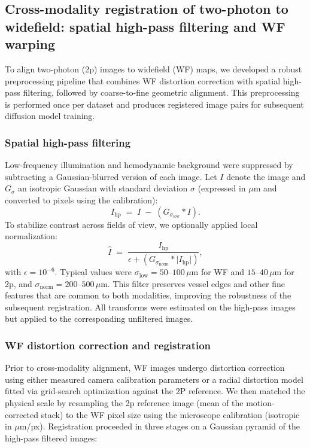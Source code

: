 
\subsection{Cross-modality registration of two-photon to widefield: spatial high-pass filtering and WF warping}

To align two-photon (2p) images to widefield (WF) maps, we developed a robust preprocessing pipeline that combines WF distortion correction with spatial high-pass filtering, followed by coarse-to-fine geometric alignment. This preprocessing is performed once per dataset and produces registered image pairs for subsequent diffusion model training.

\subsubsection*{Spatial high-pass filtering}
Low-frequency illumination and hemodynamic background were suppressed by subtracting a Gaussian-blurred version of each image. Let $I$ denote the image and $G_{\sigma}$ an isotropic Gaussian with standard deviation $\sigma$ (expressed in $\mu$m and converted to pixels using the calibration):
\[
I_{\mathrm{hp}} \;=\; I \;-\; (G_{\sigma_{\mathrm{low}}} * I).
\]
To stabilize contrast across fields of view, we optionally applied local normalization:
\[
\hat{I} \;=\; \frac{I_{\mathrm{hp}}}{\epsilon + (G_{\sigma_{\mathrm{norm}}} * \lvert I_{\mathrm{hp}} \rvert)},
\]
with $\epsilon=10^{-6}$. Typical values were $\sigma_{\mathrm{low}} = 50\text{--}100\,\mu\mathrm{m}$ for WF and $15\text{--}40\,\mu\mathrm{m}$ for 2p, and $\sigma_{\mathrm{norm}} = 200\text{--}500\,\mu\mathrm{m}$.
This filter preserves vessel edges and other fine features that are common to both modalities, improving the robustness of the subsequent registration. All transforms were estimated on the high-pass images but applied to the corresponding unfiltered images.

\subsubsection*{WF distortion correction and registration}
Prior to cross-modality alignment, WF images undergo distortion correction using either measured camera calibration parameters or a radial distortion model fitted via grid-search optimization against the 2P reference. We then matched the physical scale by resampling the 2p reference image (mean of the motion-corrected stack) to the WF pixel size using the microscope calibration (isotropic in $\mu$m/px). Registration proceeded in three stages on a Gaussian pyramid of the high-pass filtered images:

